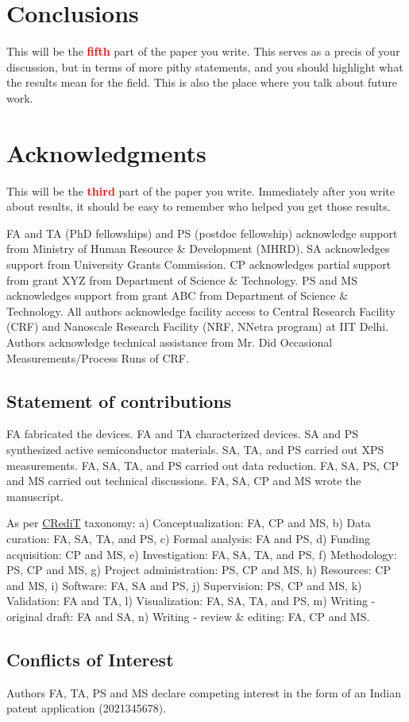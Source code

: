 \documentclass[12 pt]{article}
\begin{document}
\section{Conclusions}
\label{sec:conclusions}

This will be the \textbf{\Huge \textcolor{red}{fifth}} part of the paper you write. This serves as a precis of your discussion, but in terms of more pithy statements, and you should highlight what the results mean for the field. This is also the place where you talk about future work.

\section*{Acknowledgments}

This will be the \textbf{\Huge \textcolor{red}{third}} part of the paper you write. Immediately after you write about results, it should be easy to remember who helped you get those results.

FA and TA (PhD fellowships) and PS (postdoc fellowship) acknowledge support from Ministry of Human Resource \& Development (MHRD). SA acknowledges support from University Grants Commission. CP acknowledges partial support from grant XYZ from Department of Science \& Technology. PS and MS acknowledges support from grant ABC from Department of Science \& Technology. All authors acknowledge facility access to Central Research Facility (CRF) and Nanoscale Research Facility (NRF, NNetra program) at IIT Delhi. Authors acknowledge technical assistance from Mr. Did Occasional Measurements/Process Runs of CRF.

\subsection*{Statement of contributions}

FA fabricated the devices. FA and TA characterized devices. SA and PS synthesized active semiconductor materials. SA, TA, and PS carried out XPS measurements. FA, SA, TA, and PS carried out data reduction. FA, SA, PS, CP and MS carried out technical discussions. FA, SA, CP and MS wrote the manuscript.

As per \href{https://casrai.org/credit/}{CRediT} taxonomy: a) Conceptualization: FA, CP and MS, b) Data curation: FA, SA, TA, and PS, c) Formal analysis: FA and PS, d) Funding acquisition: CP and MS, e) Investigation: FA, SA, TA, and PS, f) Methodology: PS, CP and MS, g) Project administration: PS, CP and MS, h) Resources: CP and MS, i) Software: FA, SA and PS, j) Supervision: PS, CP and MS, k) Validation: FA and TA, l) Visualization: FA, SA, TA, and PS, m) Writing - original draft: FA and SA, n) Writing - review \& editing: FA, CP and MS.

\subsection*{Conflicts of Interest}
Authors FA, TA, PS and MS declare competing interest in the form of an Indian patent application (2021345678).


\printbibliography
\end{document}
